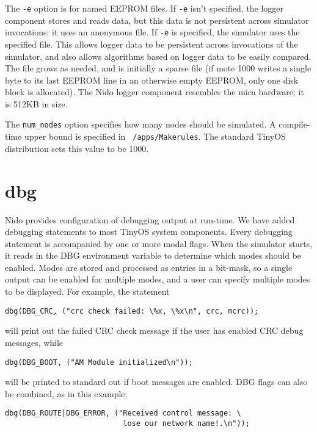 \documentclass[10pt]{article}
\begin{document}
The {\tt -e} option is for named EEPROM files. If {\tt -e} isn't
specified, the logger component stores and reads data, but this data
is not persistent across simulator invocations: it uses an anonymous
file. If {\tt -e} is specified, the simulator uses the specified
file. This allows logger data to be persistent across invocations of
the simulator, and also allows algorithms based on logger data to be
easily compared. The file grows as needed, and is initially a sparse
file (if mote 1000 writes a single byte to its last EEPROM line in an
otherwise empty EEPROM, only one disk block is allocated). The Nido
logger component resembles the mica hardware; it is 512KB in size.

The {\tt num\_nodes} option specifies how many nodes should be
simulated. A compile-time upper bound is specified in {\tt
/apps/Makerules}. The standard TinyOS distribution sets this value to be
1000.

\section*{dbg}

Nido provides configuration of debugging output at run-time. We have
added debugging statements to most TinyOS system components. Every
debugging statement is accompanied by one or more modal flags. When
the simulator starts, it reads in the DBG environment variable to determine
which modes should be enabled. Modes are stored and processed as
entries in a bit-mask, so a single output can be enabled for multiple
modes, and a user can specify multiple modes to be displayed. For
example, the statement


\begin{verbatim}
dbg(DBG_CRC, ("crc check failed: \%x, \%x\n", crc, mcrc));
\end{verbatim}


will print out the failed CRC check message if the user has enabled
CRC debug messages, while


\begin{verbatim}
dbg(DBG_BOOT, ("AM Module initialized\n"));
\end{verbatim}


will be printed to standard out if boot messages are enabled. DBG
flags can also be combined, as in this example:


\begin{verbatim}
dbg(DBG_ROUTE|DBG_ERROR, ("Received control message: \
                           lose our network name!.\n"));
\end{verbatim}
\end{document}
